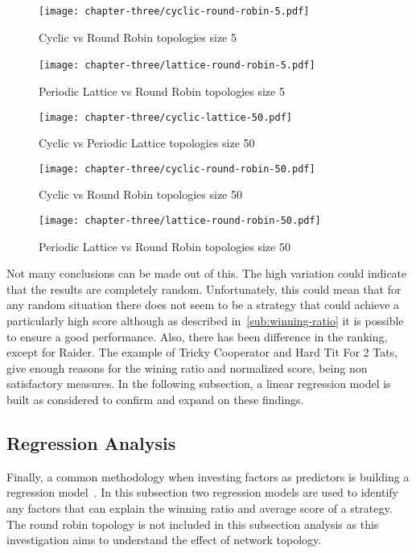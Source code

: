 \begin{figure}[H]
	\centering
	\texttt{[image: chapter-three/cyclic-round-robin-5.pdf]}\
	\caption{Cyclic vs Round Robin topologies size 5}
	\label{fig:score-rankings-five-c-r}
\end{figure}

\begin{figure}[H]
	\centering
	\texttt{[image: chapter-three/lattice-round-robin-5.pdf]}\
	\caption{Periodic Lattice vs Round
	Robin topologies size 5}
	\label{fig:score-rankings-five-l-r}
\end{figure}

\begin{figure}[H]
	\centering
	\texttt{[image: chapter-three/cyclic-lattice-50.pdf]}
	\caption{Cyclic vs Periodic Lattice topologies size 50}
	\label{fig:score-rankings-fifty-c-l}
\end{figure}

\begin{figure}[H]
	\centering
	\texttt{[image: chapter-three/cyclic-round-robin-50.pdf]}
	\caption{Cyclic vs Round Robin topologies size 50}
	\label{fig:score-rankings-fifty-c-r}
\end{figure}

\begin{figure}[H]
	\centering
	\texttt{[image: chapter-three/lattice-round-robin-50.pdf]}
	\caption{Periodic Lattice vs Round Robin topologies size 50}
	\label{fig:score-rankings-fifty-l-r}
\end{figure}

Not many conclusions can be made out of this. The high variation could indicate
that the results are completely random. Unfortunately, this could mean that for
any random situation there does not seem to be a strategy that could
achieve a particularly high score although as described in~\autoref{sub:winning-ratio}
it is possible to ensure a good performance. Also, there has been difference in
the ranking, except for Raider. The example of Tricky Cooperator and Hard Tit For 2 Tats,
give enough reasons for the wining ratio and normalized score, being non satisfactory
measures. In the following subsection, a linear regression model is built as
considered to confirm and expand on these findings.

\subsection{Regression Analysis}
\label{sub:regression}
Finally, a common methodology when investing factors as predictors is building a
regression model~\cite{Bingham2010}. In this subsection two regression models are
used to identify any factors that can explain the winning ratio and average score
of a strategy. The round robin topology is not included in this subsection analysis
as this investigation aims to understand the effect of network topology.

